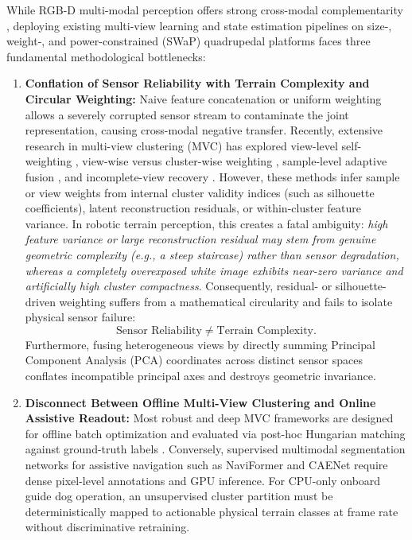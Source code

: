 \documentclass[11pt, a4paper]{article}
\begin{document}
While RGB-D multi-modal perception offers strong cross-modal complementarity \cite{sun2024bmfnet, wang2026guided, wu2024transformer, tang2025cascading}, deploying existing multi-view learning and state estimation pipelines on size-, weight-, and power-constrained (SWaP) quadrupedal platforms faces three fundamental methodological bottlenecks:
\begin{enumerate}
    \item \textbf{Conflation of Sensor Reliability with Terrain Complexity and Circular Weighting:} Naive feature concatenation or uniform weighting allows a severely corrupted sensor stream to contaminate the joint representation, causing cross-modal negative transfer. Recently, extensive research in multi-view clustering (MVC) has explored view-level self-weighting \cite{zhu2020self, yan2020adaptive, nie2020multiview, shi2025deep}, view-wise versus cluster-wise weighting \cite{hu2022view}, sample-level adaptive fusion \cite{houfar2023automatically, yang2025deep, he2026adaptive}, and incomplete-view recovery \cite{yang2022robust, li2022refining, liu2024low}. However, these methods infer sample or view weights from internal cluster validity indices (such as silhouette coefficients), latent reconstruction residuals, or within-cluster feature variance. In robotic terrain perception, this creates a fatal ambiguity: \emph{high feature variance or large reconstruction residual may stem from genuine geometric complexity (e.g., a steep staircase) rather than sensor degradation, whereas a completely overexposed white image exhibits near-zero variance and artificially high cluster compactness}. Consequently, residual- or silhouette-driven weighting suffers from a mathematical circularity and fails to isolate physical sensor failure:
    \begin{equation}
        \text{Sensor Reliability} \neq \text{Terrain Complexity}.
        \label{eq:inequality}
    \end{equation}
    Furthermore, fusing heterogeneous views by directly summing Principal Component Analysis (PCA) coordinates across distinct sensor spaces conflates incompatible principal axes and destroys geometric invariance.
    \item \textbf{Disconnect Between Offline Multi-View Clustering and Online Assistive Readout:} Most robust and deep MVC frameworks \cite{xia2014robust, wang2022adversarial, chen2025multi, yang2025deep, he2026adaptive} are designed for offline batch optimization and evaluated via post-hoc Hungarian matching against ground-truth labels \cite{chao2021survey, chowdhury2025deep}. Conversely, supervised multimodal segmentation networks for assistive navigation such as NaviFormer \cite{bui2026naviformer} and CAENet \cite{tang2025cascading} require dense pixel-level annotations and GPU inference. For CPU-only onboard guide dog operation, an unsupervised cluster partition must be deterministically mapped to actionable physical terrain classes at frame rate without discriminative retraining.

\end{enumerate}
\end{document}
